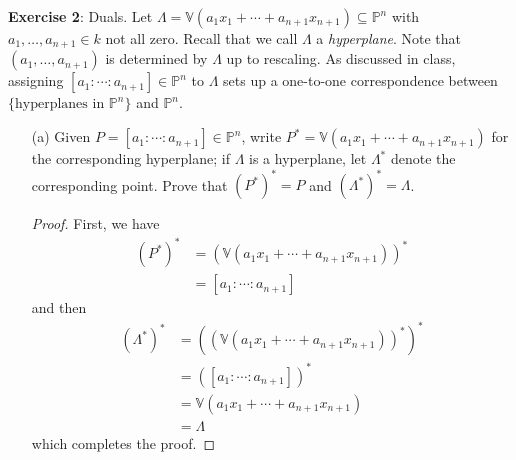 \documentclass{article}
\begin{document}
\textbf{Exercise 2}: Duals. Let $ \Lambda = \mathbb{V}(a_{1}x_{1} + \cdots + a_{n + 1}x_{n + 1}) \subseteq \mathbb{P}^{n}$ with $a_{1}, \ldots, a_{n + 1} \in k$ not all zero. Recall that we call $\Lambda$ a \textit{hyperplane}. Note that $(a_{1}, \ldots, a_{n + 1})$ is determined by $\Lambda$ up to rescaling. As discussed in class, assigning $[a_{1} : \cdots : a_{n + 1}] \in \mathbb{P}^{n}$ to $\Lambda$ sets up a one-to-one correspondence between $\{\text{hyperplanes in $\mathbb{P}^{n}$}\}$ and $\mathbb{P}^{n}$.
    \begin{itemize}
        \item [(a)] Given $P = [a_{1} : \cdots : a_{n + 1}] \in \mathbb{P}^{n}$, write $P^{*} = \mathbb{V}(a_{1}x_{1} + \cdots + a_{n + 1}x_{n + 1})$ for the corresponding hyperplane; if $\Lambda$ is a hyperplane, let $\Lambda^{*}$ denote the corresponding point. Prove that $(P^{*})^{*} = P$ and $(\Lambda^{*})^{*} = \Lambda$.
            \begin{proof}
                First, we have
                    \begin{align*}
                        (P^{*})^{*} &= (\mathbb{V}(a_{1}x_{1} + \cdots + a_{n + 1}x_{n + 1}))^{*} \\
                                    &= [a_{1} : \cdots : a_{n + 1}]                                 
                    \end{align*}
                and then 
                    \begin{align*}
                            (\Lambda^{*})^{*} &= ((\mathbb{V}(a_{1}x_{1} + \cdots + a_{n + 1}x_{n + 1}))^{*})^{*} \\
                                                                  &= ([a_{1} : \cdots : a_{n + 1}])^{*}                               \\
                                                                  &= \mathbb{V}(a_{1}x_{1} + \cdots + a_{n + 1}x_{n + 1})             \\
                                                                  &= \Lambda                                                            
                    \end{align*}
                which completes the proof.
            \end{proof}


\end{itemize}
\end{document}
